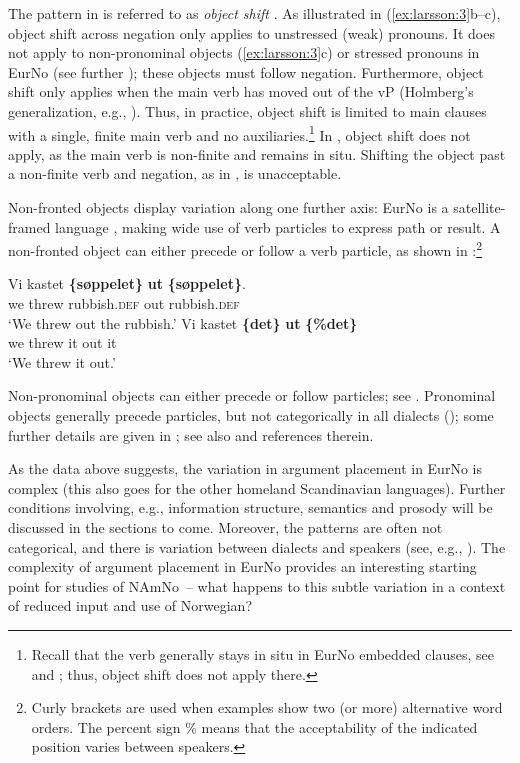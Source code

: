 \documentclass[output=paper]{langscibook}
\begin{document}
The pattern in  is referred to as \textit{object shift} \citep{Holmberg1986}. As illustrated in (\ref{ex:larsson:3}b–c), object shift across negation only applies to unstressed (weak) pronouns. It does not apply to non-pronominal objects (\ref{ex:larsson:3}c) or stressed pronouns in EurNo (see further ); these objects must follow negation. Furthermore, object shift only applies when the main verb has moved out of the vP (Holmberg’s generalization, e.g., \citealt{Holmberg1986,Holmberg1999}). Thus, in practice, object shift is limited to main clauses with a single, finite main verb and no auxiliaries.\footnote{Recall that the verb generally stays in situ in EurNo embedded clauses, see  and ; thus, object shift does not apply there.} In , object shift does not apply, as the main verb is non-finite and remains in situ. Shifting the object past a non-finite verb and negation, as in , is unacceptable. 

Non-fronted objects display variation along one further axis: EurNo is a satellite-framed language \citep{Talmy2000}, making wide use of verb particles to express path or result. A non-fronted object can either precede or follow a verb particle, as shown in :\footnote{Curly brackets are used when examples show two (or more) alternative word orders. The percent sign \% means that the acceptability of the indicated position varies between speakers.} 

\ea \label{ex:larsson:4}
\ea \label{ex:larsson:4a}
\gll Vi kastet \textbf{\{søppelet\}} \textbf{ut} \textbf{\{søppelet\}}.\\
     we threw rubbish.\textsc{def} out rubbish.\textsc{def}\\
\glt ‘We threw out the rubbish.’
\ex \label{ex:larsson:4b}
\gll Vi kastet \textbf{\{det\}} \textbf{ut} \textbf{\{\%det\}}\\
     we threw it out it\\
\glt ‘We threw it out.’
\z
\z

Non-pronominal objects can either precede or follow particles; see . Pronominal objects generally precede particles, but not categorically in all dialects (\citealt{LarssonLundquist2014}); some further details are given in ; see also \citet{Aa2020} and references therein. 

As the data above suggests, the variation in argument placement in EurNo is complex (this also goes for the other homeland Scandinavian languages). Further conditions involving, e.g., information structure, semantics and prosody will be discussed in the sections to come. Moreover, the patterns are often not categorical, and there is variation between dialects and speakers (see, e.g., \citealt{LarssonLundquist2014, LundquistTengesdal2022}). The complexity of argument placement in EurNo provides an interesting starting point for studies of NAmNo~– what happens to this subtle variation in a context of reduced input and use of Norwegian?
\end{document}

